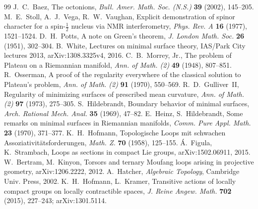 \documentclass[11pt,reqno]{amsart}
\theoremstyle{definition}
\theoremstyle{remark}
\numberwithin{equation}{section}
\begin{document}
\begin{thebibliography}{99}
 J.~C.~Baez, The octonions, \emph{Bull. Amer. Math. Soc. (N.S.)} \textbf{39} (2002), 145--205.
 M.~E.~Stoll, A.~J.~Vega, R.~W.~Vaughan, Explicit demonstration of spinor character for a spin-$\tfrac12$ nucleus via NMR interferometry, \emph{Phys. Rev. A} \textbf{16} (1977), 1521--1524.
 D.~H.~Potts, A note on Green's theorem, \emph{J. London Math. Soc.} \textbf{26} (1951), 302--304.
 B.~White, Lectures on minimal surface theory, IAS/Park City lectures 2013, arXiv:1308.3325v4, 2016.
 C.~B.~Morrey, Jr., The problem of Plateau on a Riemannian manifold, \emph{Ann. of Math. (2)} \textbf{49} (1948), 807--851.
 R.~Osserman, A proof of the regularity everywhere of the classical solution to Plateau's problem, \emph{Ann. of Math. (2)} \textbf{91} (1970), 550--569.
 R.~D.~Gulliver~II, Regularity of minimizing surfaces of prescribed mean curvature, \emph{Ann. of Math. (2)} \textbf{97} (1973), 275--305.
 S.~Hildebrandt, Boundary behavior of minimal surfaces, \emph{Arch. Rational Mech. Anal.} \textbf{35} (1969), 47--82.
 E.~Heinz, S.~Hildebrandt, Some remarks on minimal surfaces in Riemannian manifolds, \emph{Comm. Pure Appl. Math.} \textbf{23} (1970), 371--377.
 K.~H.~Hofmann, Topologische Loops mit schwachen Assoziativit\"atsforderungen, \emph{Math. Z.} \textbf{70} (1958), 125--155.
 \'A.~Figula, K.~Strambach, Loops as sections in compact Lie groups, arXiv:1502.06911, 2015.
 W.~Bertram, M.~Kinyon, Torsors and ternary Moufang loops arising in projective geometry, arXiv:1206.2222, 2012.
 A.~Hatcher, \emph{Algebraic Topology}, Cambridge Univ. Press, 2002.
 K.~H.~Hofmann, L.~Kramer, Transitive actions of locally compact groups on locally contractible spaces, \emph{J. Reine Angew. Math.} \textbf{702} (2015), 227--243; arXiv:1301.5114.

\end{thebibliography}
\end{document}
